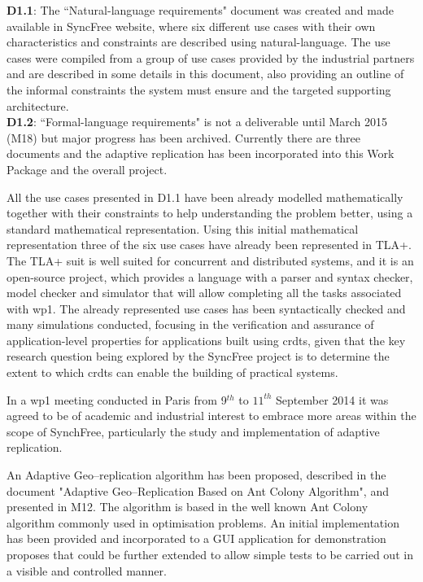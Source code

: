 \documentclass[12pt,twoside]{article}
\begin{document}
{\bf D1.1}: The ``Natural-language requirements" document was created and made available in SyncFree website, where six different use cases with their own characteristics and constraints are described using natural-language. The use cases were compiled from a group of use cases provided by the industrial partners and are described in some details in this document, also providing an outline of the informal constraints the system must ensure and the targeted supporting architecture.\\

{\bf D1.2}: ``Formal-language requirements" is not a deliverable until March 2015 (M18) but major progress has been archived. Currently there are three documents and the adaptive replication has been incorporated into this Work Package and the overall project.

All the use cases presented in D1.1 have been already modelled mathematically together with their constraints to help understanding the problem better, using a standard mathematical representation. Using this initial mathematical representation three of the six use cases have already been represented in TLA+. The TLA+ suit is well suited for concurrent and distributed systems, and it is an open-source project, which provides a language with a parser and syntax checker, model checker and simulator that will allow completing all the tasks associated with \gls{wp1}. The already represented use cases has been syntactically checked and many simulations conducted,  focusing in the verification and assurance of application-level properties for applications built using \glspl{crdt}, given that the key research question being explored by the SyncFree project is to determine the extent to which \glspl{crdt} can enable the building of practical systems.

In a \gls{wp1} meeting conducted in Paris from 9$^{th}$ to $11^{th}$ September 2014 it was agreed to be of academic and industrial interest to embrace more areas within the scope of SynchFree, particularly the study and implementation of adaptive replication.

An Adaptive Geo--replication algorithm has been proposed, described in the document "Adaptive Geo--Replication Based on Ant Colony Algorithm", and presented in M12. The algorithm is based in the well known Ant Colony algorithm commonly used in optimisation problems. An initial implementation has been provided and incorporated to a GUI application for demonstration proposes that could be further extended to allow simple tests to be carried out in a visible and controlled manner.
\end{document}
